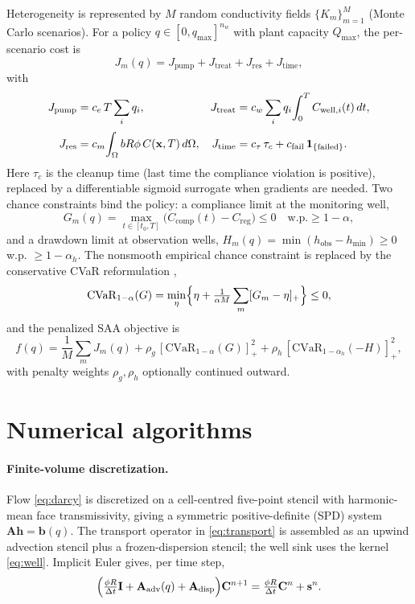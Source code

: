 \documentclass[10pt]{article}
\newcommand{\Cvar}{\mathrm{CVaR}}
\begin{document}
Heterogeneity is represented by $M$ random conductivity fields
$\{K_m\}_{m=1}^M$ (Monte Carlo scenarios). For a policy
$q\in[0,q_{\max}]^{n_w}$ with plant capacity $Q_{\max}$, the per-scenario cost
is
\begin{equation}
J_m(q)=J_{\mathrm{pump}}+J_{\mathrm{treat}}+J_{\mathrm{res}}+J_{\mathrm{time}},
\label{eq:cost}
\end{equation}
with
\begin{align}
J_{\mathrm{pump}}&=c_e\,T\sum_i q_i,
&
J_{\mathrm{treat}}&=c_w\sum_i q_i\!\int_0^T C_{\mathrm{well},i}(t)\,dt,\notag\\[2pt]
J_{\mathrm{res}}&=c_m\!\int_\Omega b R\phi\,C(\mathbf{x},T)\,d\Omega,
&
J_{\mathrm{time}}&=c_\tau\,\tau_c+c_{\mathrm{fail}}\,\mathbf{1}_{\{\text{failed}\}}.
\label{eq:costterms}
\end{align}
Here $\tau_c$ is the cleanup time (last time the compliance violation is
positive), replaced by a differentiable sigmoid surrogate when gradients are
needed. Two chance constraints bind the policy: a compliance limit at the
monitoring well,
\begin{equation}
G_m(q)=\max_{t\in[t_0,T]}\bigl(C_{\mathrm{comp}}(t)-C_{\mathrm{reg}}\bigr)\le0
\quad\text{w.p.}\ge1-\alpha,
\label{eq:G}
\end{equation}
and a drawdown limit at observation wells,
$H_m(q)=\min(h_{\mathrm{obs}}-h_{\min})\ge0$ w.p. $\ge1-\alpha_h$. The
nonsmooth empirical chance constraint is replaced by the conservative CVaR
reformulation \cite{rockafellar2000optimization},
\begin{equation}
\Cvar_{1-\alpha}(G)=\min_{\eta}\Bigl\{\eta+\tfrac{1}{\alpha M}\sum_m [G_m-\eta]_+\Bigr\}\le0,
\label{eq:cvar}
\end{equation}
and the penalized SAA objective is
\begin{equation}
f(q)=\frac1M\sum_m J_m(q)
+\rho_g\,[\Cvar_{1-\alpha}(G)]_+^2
+\rho_h\,[\Cvar_{1-\alpha_h}(-H)]_+^2,
\label{eq:saa}
\end{equation}
with penalty weights $\rho_g,\rho_h$ optionally continued outward.

\section{Numerical algorithms}
\label{sec:alg}

\paragraph{Finite-volume discretization.}
Flow \eqref{eq:darcy} is discretized on a cell-centred five-point stencil with
harmonic-mean face transmissivity, giving a symmetric positive-definite (SPD)
system $\mathbf{A}\mathbf{h}=\mathbf{b}(q)$. The transport operator in
\eqref{eq:transport} is assembled as an upwind advection stencil plus a
frozen-dispersion stencil; the well sink uses the kernel \eqref{eq:well}.
Implicit Euler gives, per time step,
\begin{equation}
\Bigl(\tfrac{\phi R}{\Delta t}\mathbf{I}+\mathbf{A}_{\mathrm{adv}}(q)+\mathbf{A}_{\mathrm{disp}}\Bigr)
\mathbf{C}^{n+1}=\tfrac{\phi R}{\Delta t}\mathbf{C}^{n}+\mathbf{s}^{n}.
\label{eq:ie}
\end{equation}
\end{document}
